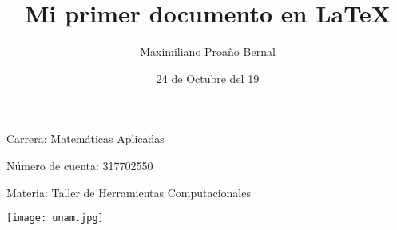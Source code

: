 \documentclass{article} %
\title{Mi primer documento en LaTeX}
\author{Maximiliano Proaño Bernal}
\date{24 de Octubre del 19}
\begin{document}
	\begin{titlepage}
		\maketitle
	\end{titlepage}

Carrera: Matemáticas Aplicadas

Número de cuenta: 317702550

Materia: Taller de Herramientas Computacionales
\vfill

\texttt{[image: unam.jpg]}
\end{document}
